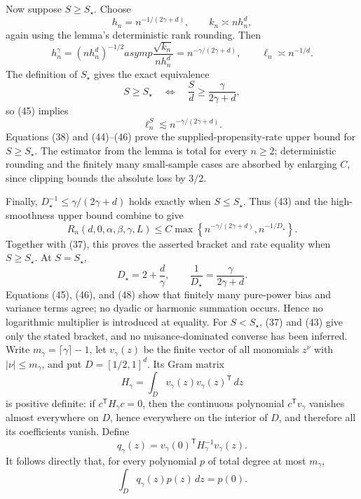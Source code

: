 Now suppose \(S\geq S_\star\).  Choose
\[
 h_n=n^{-1/(2\gamma+d)},
 \qquad
 k_n\asymp nh_n^d,
 \tag{44}
\]
again using the lemma's deterministic rank rounding.  Then
\[
 h_n^\gamma=(nh_n^d)^{-1/2}asymp\frac{\sqrt{k_n}}{nh_n^d}
 =n^{-\gamma/(2\gamma+d)},
 \qquad
 \ell_n\asymp n^{-1/d}.
 \tag{45}
\]
The definition of \(S_\star\) gives the exact equivalence
\[
 S\geq S_\star
 \quad\Longleftrightarrow\quad
 \frac Sd\geq\frac\gamma{2\gamma+d},
\]
so (45) implies
\[
 \ell_n^S\lesssim n^{-\gamma/(2\gamma+d)}.
 \tag{46}
\]
Equations (38) and (44)--(46) prove the supplied-propensity-rate upper bound for \(S\geq S_\star\).  The estimator from the lemma is total for every \(n\geq2\); deterministic rounding and the finitely many small-sample cases are absorbed by enlarging \(C\), since clipping bounds the absolute loss by \(3/2\).

Finally, \(D_\star^{-1}\leq\gamma/(2\gamma+d)\) holds exactly when \(S\leq S_\star\).  Thus (43) and the high-smoothness upper bound combine to give
\[
 R_n(d,0,\alpha,\beta,\gamma,L)
 \leq C\max\left\{n^{-\gamma/(2\gamma+d)},n^{-1/D_\star}\right\}.
 \tag{47}
\]
Together with (37), this proves the asserted bracket and rate equality when \(S\geq S_\star\).  At \(S=S_\star\),
\[
 D_\star=2+\frac d\gamma,
 \qquad
 \frac1{D_\star}=\frac\gamma{2\gamma+d}.
 \tag{48}
\]
Equations (45), (46), and (48) show that finitely many pure-power bias and variance terms agree; no dyadic or harmonic summation occurs.  Hence no logarithmic multiplier is introduced at equality.  For \(S<S_\star\), (37) and (43) give only the stated bracket, and no nuisance-dominated converse has been inferred.
Write \(m_\gamma=\lceil\gamma\rceil-1\), let \(v_\gamma(z)\) be the finite vector of all monomials \(z^\nu\) with \(|\nu|\leq m_\gamma\), and put \(D=[1/2,1]^d\).  Its Gram matrix
\[
 H_\gamma=\int_Dv_\gamma(z)v_\gamma(z)^{\mathsf T}\,dz
\]
is positive definite: if \(c^{\mathsf T}H_\gamma c=0\), then the continuous polynomial \(c^{\mathsf T}v_\gamma\) vanishes almost everywhere on \(D\), hence everywhere on the interior of \(D\), and therefore all its coefficients vanish.  Define
\[
 q_\gamma(z)=v_\gamma(0)^{\mathsf T}H_\gamma^{-1}v_\gamma(z).
\]
It follows directly that, for every polynomial \(p\) of total degree at most \(m_\gamma\),
\[
 \int_Dq_\gamma(z)p(z)\,dz=p(0).
 \tag{1}
\]

